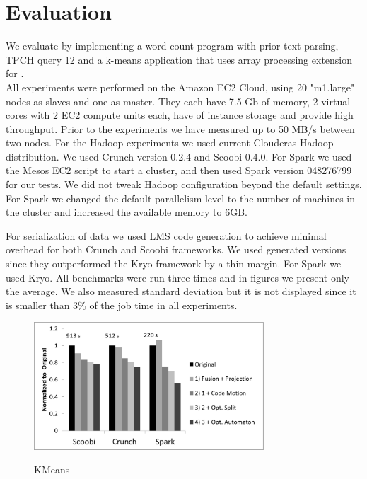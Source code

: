 \section{Evaluation}
\label{sec:evaluation}


We evaluate \tool by implementing a word count program with prior text parsing, TPCH query 12 and a k-means application that uses array processing extension for \tool. \\

All experiments were performed on the Amazon EC2 Cloud, using 20 "m1.large" nodes as slaves and one as master. They each have 7.5 Gb of memory, 2 virtual cores with 2 EC2 compute units each, have  of instance storage and provide high throughput. Prior to the experiments we have measured up to 50 MB/s between two nodes. For the Hadoop experiments we used current Clouderas Hadoop distribution. We used Crunch version 0.2.4 and Scoobi 0.4.0. For Spark we used the Mesos  EC2 script to start a cluster, and then used Spark version 048276799 for our tests. We did not tweak Hadoop configuration beyond the default settings. For Spark we changed the default parallelism level to the number of machines in the cluster and increased the available memory to 6GB. 


For serialization of data we used LMS code generation to achieve minimal overhead for both Crunch and Scoobi frameworks. We used generated versions since they outperformed the Kryo framework by a thin margin. For Spark we used Kryo. All benchmarks were run three times and in figures we present only the average. We also measured standard deviation but it is not displayed since it is smaller than 3\% of the job time in all experiments.

\begin{figure}[!hbt]
    \includegraphics[width=8.6cm]{figures/word-count}
    \label{fig:word-count}\\%
   \caption{KMeans}
\end{figure}

